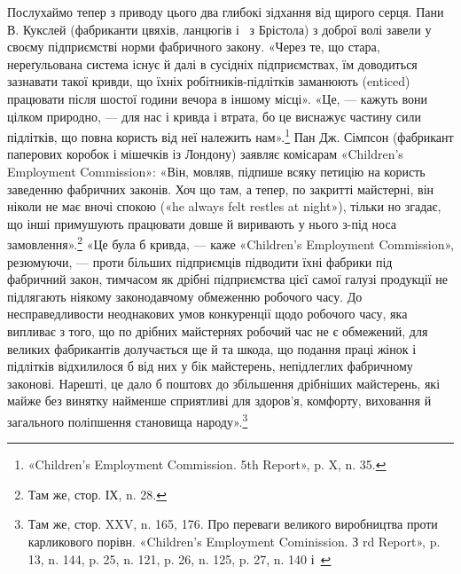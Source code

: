 \parcont{}  %
Послухаймо тепер з приводу цього два глибокі зідхання від щирого серця. Пани
В. Кукслей (фабриканти цвяхів, ланцюгів і~ з Брістола) з доброї волі
завели у своєму підприємстві норми фабричного
закону. «Через те, що стара, нереґульована система існує й далі в сусідніх
підприємствах, їм доводиться зазнавати такої кривди, що їхніх
робітників-підлітків заманюють (enticed) працювати після
шостої години вечора в іншому місці». «Це, — кажуть вони цілком природно, — для
нас і кривда і втрата, бо це виснажує частину сили підлітків, що повна користь
від неї належить нам».\footnote{
«Children's Employment Commission. 5th Report», p. X, n. 35.
} Пан Дж. Сімпсон (фабрикант паперових коробок і мішечків із Лондону) заявляє
комісарам «Children’s Employment Commission»: «Він, мовляв, підпише всяку
петицію на користь заведенню фабричних законів. Хоч що там,
а тепер, по закритті майстерні, він ніколи не має вночі спокою («he always felt
restles at night»), тільки но згадає, що інші примушують працювати довше й
виривають у нього з-під носа замовлення».\footnote{
Там же, стор. ІХ, n. 28.
}
«Це була б кривда, — каже «Children’s Employment Commission», резюмуючи, —
проти більших підприємців підводити їхні фабрики під фабричний закон, тимчасом
як дрібні підприємства цієї самої галузі
продукції не підлягають ніякому законодавчому обмеженню робочого часу. До
несправедливости неоднакових умов конкуренції щодо робочого часу, яка випливає
з того, що по дрібних майстернях робочий час не є обмежений, для великих
фабрикантів долучається ще й та шкода, що подання праці
жінок і підлітків відхилилося б від них у бік майстерень, непідлеглих
фабричному законові. Нарешті, це дало б поштовх до збільшення дрібніших
майстерень, які майже без винятку найменше сприятливі для
здоров’я, комфорту, виховання й загального поліпшення становища народу».\footnote{
Там же, стор. XXV, n. 165, 176. Про переваги великого виробництва проти
карликового порівн. «Children’s Employment Cominission. З rd Report», p. 13,
n. 144, p. 25, n. 121, p. 26, n. 125, p. 27, n. 140 і~
}

